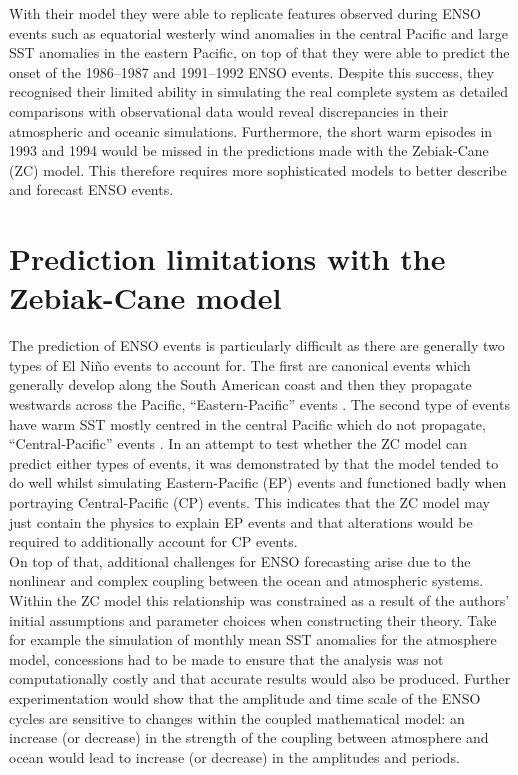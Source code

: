 \documentclass[12pt, onecolumn]{revtex4}    %
\begin{document}
With their model they were able to replicate features observed during ENSO events such as equatorial westerly wind anomalies in the central Pacific and large SST anomalies in the eastern Pacific, on top of that they were able to predict the onset of the 1986--1987 and 1991--1992 ENSO events. Despite this success, they recognised their limited ability in simulating the real complete system as detailed comparisons with observational data would reveal discrepancies in their atmospheric and oceanic simulations. Furthermore, the short warm episodes in 1993 and 1994 would be missed in the predictions made with the Zebiak-Cane (ZC) model. This therefore requires more sophisticated models to better describe and forecast ENSO events.

\section{Prediction limitations with the Zebiak-Cane model}

The prediction of ENSO events is particularly difficult as there are generally two types of El Ni\~{n}o events to account for. The first are canonical events which generally develop along the South American coast and then they propagate westwards across the Pacific, ``Eastern-Pacific'' events \citep{rasmusson1982variations}. The second type of events have warm SST mostly centred in the central Pacific which do not propagate, ``Central-Pacific'' events \citep{ashok2007nino}. In an attempt to test whether the ZC model can predict either types of events, it was demonstrated by \cite{duan2013behaviors} that the model tended to do well whilst simulating Eastern-Pacific (EP) events and functioned badly when portraying Central-Pacific (CP) events. This indicates that the ZC model may just contain the physics to explain EP events and that alterations would be required to additionally account for CP events. \\

On top of that, additional challenges for ENSO forecasting arise due to the nonlinear and complex coupling between the ocean and atmospheric systems. Within the ZC model this relationship was constrained as a result of the authors' initial assumptions and parameter choices when constructing their theory. Take for example the simulation of monthly mean SST anomalies for the atmosphere model, concessions had to be made to ensure that the analysis was not computationally costly and that accurate results would also be produced. Further experimentation would show that the amplitude and time scale of the ENSO cycles are sensitive to changes within the coupled mathematical model: an increase (or decrease) in the strength of the coupling between atmosphere and ocean would lead to increase (or decrease) in the amplitudes and periods. \\
\end{document}
